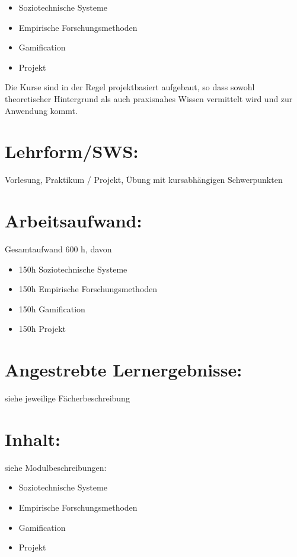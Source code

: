 \begin{itemize}
\item
  Soziotechnische Systeme
\item
  Empirische Forschungsmethoden
\item
  Gamification
\item
  Projekt
\end{itemize}

Die Kurse sind in der Regel projektbasiert aufgebaut, so dass sowohl
theoretischer Hintergrund als auch praxisnahes Wissen vermittelt wird
und zur Anwendung kommt.

\section*{Lehrform/SWS:}\label{lehrformsws-27}

Vorlesung, Praktikum / Projekt, Übung mit kursabhängigen Schwerpunkten

\section*{Arbeitsaufwand:}\label{arbeitsaufwand-23}

Gesamtaufwand 600 h, davon

\begin{itemize}
\item
  150h Soziotechnische Systeme
\item
  150h Empirische Forschungsmethoden
\item
  150h Gamification
\item
  150h Projekt
\end{itemize}

\section*{Angestrebte
Lernergebnisse:}\label{angestrebte-lernergebnisse-31}

siehe jeweilige Fächerbeschreibung

\section*{Inhalt:}\label{inhalt-31}

siehe Modulbeschreibungen:

\begin{itemize}
\item
  Soziotechnische Systeme
\item
  Empirische Forschungsmethoden
\item
  Gamification
\item
  Projekt
\end{itemize}

